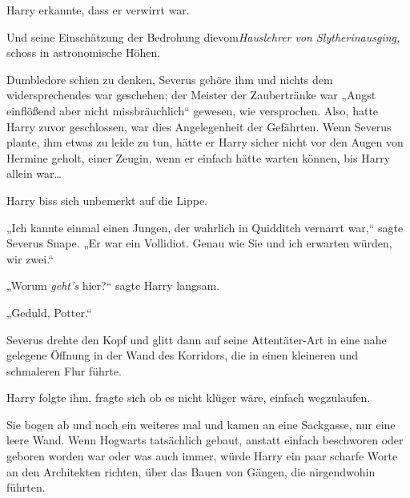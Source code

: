 Harry erkannte, dass er verwirrt war.

Und seine Einschätzung der Bedrohung dievom\emph{Hauslehrer von Slytherinausging,} schoss in astronomische Höhen.

Dumbledore schien zu denken, Severus gehöre ihm und nichts dem widersprechendes war geschehen; der Meister der Zaubertränke war „Angst einflößend aber nicht missbräuchlich“ gewesen, wie versprochen. Also, hatte Harry zuvor geschlossen, war dies Angelegenheit der Gefährten. Wenn Severus plante, ihm etwas zu leide zu tun, hätte er Harry sicher nicht vor den Augen von Hermine geholt, einer Zeugin, wenn er einfach hätte warten können, bis Harry allein war…

Harry biss sich unbemerkt auf die Lippe.

„Ich kannte einmal einen Jungen, der wahrlich in Quidditch vernarrt war,“ sagte Severus Snape. „Er war ein Vollidiot. Genau wie Sie und ich erwarten würden, wir zwei.“

„Worum \emph{geht's} hier?“ sagte Harry langsam.

„Geduld, Potter.“

Severus drehte den Kopf und glitt dann auf seine Attentäter-Art in eine nahe gelegene Öffnung in der Wand des Korridors, die in einen kleineren und schmaleren Flur führte.

Harry folgte ihm, fragte sich ob es nicht klüger wäre, einfach wegzulaufen.

Sie bogen ab und noch ein weiteres mal und kamen an eine Sackgasse, nur eine leere Wand. Wenn Hogwarts tatsächlich gebaut, anstatt einfach beschworen oder geboren worden war oder was auch immer, würde Harry ein paar scharfe Worte an den Architekten richten, über das Bauen von Gängen, die nirgendwohin führten.

